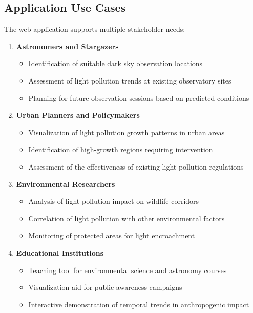 \documentclass[12pt,a4paper]{article}
\begin{document}
\subsection{Application Use Cases}

The web application supports multiple stakeholder needs:

\begin{enumerate}
    \item \textbf{Astronomers and Stargazers}
    \begin{itemize}
        \item Identification of suitable dark sky observation locations
        \item Assessment of light pollution trends at existing observatory sites
        \item Planning for future observation sessions based on predicted conditions
    \end{itemize}
    
    \item \textbf{Urban Planners and Policymakers}
    \begin{itemize}
        \item Visualization of light pollution growth patterns in urban areas
        \item Identification of high-growth regions requiring intervention
        \item Assessment of the effectiveness of existing light pollution regulations
    \end{itemize}
    
    \item \textbf{Environmental Researchers}
    \begin{itemize}
        \item Analysis of light pollution impact on wildlife corridors
        \item Correlation of light pollution with other environmental factors
        \item Monitoring of protected areas for light encroachment
    \end{itemize}
    
    \item \textbf{Educational Institutions}
    \begin{itemize}
        \item Teaching tool for environmental science and astronomy courses
        \item Visualization aid for public awareness campaigns
        \item Interactive demonstration of temporal trends in anthropogenic impact
    \end{itemize}
\end{enumerate}
\end{document}
